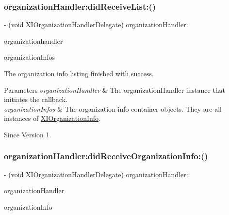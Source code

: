 \subsubsection{\texorpdfstring{organization\+Handler\+:did\+Receive\+List\+:()}{organizationHandler:didReceiveList:()}}
{\footnotesize\ttfamily -\/ (void X\+I\+Organization\+Handler\+Delegate) organization\+Handler\+: \begin{DoxyParamCaption}\item[{(id$<$ X\+I\+Organization\+Handler $>$)}]{organizationhandler }\item[{didReceiveList:(N\+S\+Array $\ast$)}]{organization\+Infos }\end{DoxyParamCaption}}



The organization info listing finished with success. 


\begin{DoxyParams}{Parameters}
{\em organization\+Handler} & The organization\+Handler instance that initiates the callback. \\
\hline
{\em organization\+Infos} & The organization info container objects. They are all instances of \hyperlink{class_x_i_organization_info}{X\+I\+Organization\+Info}. \\
\hline
\end{DoxyParams}
\begin{DoxySince}{Since}
Version 1. 
\end{DoxySince}
\hypertarget{protocol_x_i_organization_handler_delegate_01-p_a5e44780373062b185cf11e3598b39cdf}{}\label{protocol_x_i_organization_handler_delegate_01-p_a5e44780373062b185cf11e3598b39cdf} 
\subsubsection{\texorpdfstring{organization\+Handler\+:did\+Receive\+Organization\+Info\+:()}{organizationHandler:didReceiveOrganizationInfo:()}}
{\footnotesize\ttfamily -\/ (void X\+I\+Organization\+Handler\+Delegate) organization\+Handler\+: \begin{DoxyParamCaption}\item[{(id$<$ X\+I\+Organization\+Handler $>$)}]{organization\+Handler }\item[{didReceiveOrganizationInfo:(\hyperlink{class_x_i_organization_info}{X\+I\+Organization\+Info} $\ast$)}]{organization\+Info }\end{DoxyParamCaption}}



